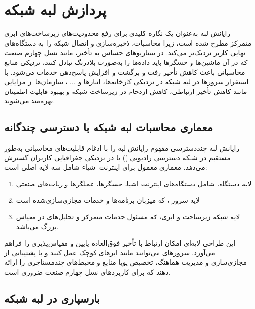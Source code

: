 \section{پردازش لبه شبکه}

رایانش لبه به‌عنوان یک نگاره کلیدی برای رفع محدودیت‌های زیرساخت‌های ابری متمرکز مطرح شده است، زیرا محاسبات، ذخیره‌سازی و اتصال شبکه را به دستگاه‌های نهایی کاربر نزدیک‌تر می‌کند. در سناریوهای حساس به تأخیر، مانند نسل چهارم صنعت که در آن ماشین‌ها و حسگرها باید داده‌ها را به‌صورت بلادرنگ تبادل کنند، نزدیکی منابع محاسباتی باعث کاهش تأخیر رفت و برگشت و افزایش پاسخ‌دهی خدمات می‌شود. با استقرار سرورها در لبه شبکه در نزدیکی کارخانه‌ها، انبارها و ... ، سازمان‌ها از مزایایی مانند کاهش تأخیر ارتباطی، کاهش ازدحام در زیرساخت شبکه و بهبود قابلیت اطمینان بهره‌مند می‌شوند.

\subsection{معماری محاسبات لبه شبکه با دسترسی چندگانه}

رایانش لبه چنددسترسی  مفهوم رایانش لبه را با ادغام قابلیت‌های محاسباتی به‌طور مستقیم در شبکه دسترسی رادیویی () یا در نزدیکی جغرافیایی کاربران گسترش می‌دهد. معماری معمول  برای اینترنت اشیاء شامل سه لایه اصلی است:

\begin{enumerate}
\item
لایه دستگاه، شامل دستگاه‌های اینترنت اشیا، حسگرها، عملگرها و ربات‌های صنعتی

\item
لایه سرور ، که میزبان برنامه‌ها و خدمات مجازی‌سازی‌شده است

\item
لایه شبکه زیرساخت و ابری، که مسئول خدمات متمرکز و تحلیل‌های در مقیاس بزرگ می‌باشد. 
\end{enumerate}

این طراحی لایه‌ای امکان ارتباط با تأخیر فوق‌العاده پایین و مقیاس‌پذیری را فراهم می‌آورد. سرورهای  می‌توانند مانند ابرهای کوچک عمل کنند و با پشتیبانی از مجازی‌سازی و مدیریت هماهنگ، تخصیص پویا منابع و محیط‌های چندمستاجری را ارائه دهند که برای کاربردهای نسل چهارم صنعت ضروری است.

\subsection{بارسپاری در لبه شبکه}

